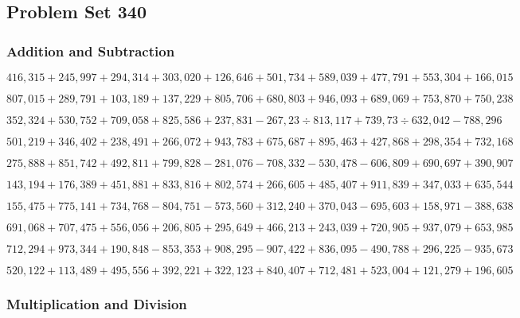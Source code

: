 \hypertarget{problem-set-340}{%
\subsection{Problem Set 340}\label{problem-set-340}}

\hypertarget{addition-and-subtraction}{%
\subsubsection{Addition and
Subtraction}\label{addition-and-subtraction}}

\(416,315+245,997+294,314+303,020+126,646+501,734+589,039+477,791+553,304+166,015\)

\(807,015+289,791+103,189+137,229+805,706+680,803+946,093+689,069+753,870+750,238\)

\(352,324+530,752+709,058+825,586+237,831-267,23÷813,117+739,73÷632,042-788,296\)

\(501,219+346,402+238,491+266,072+943,783+675,687+895,463+427,868+298,354+732,168\)

\(275,888+851,742+492,811+799,828-281,076-708,332-530,478-606,809+690,697+390,907\)

\(143,194+176,389+451,881+833,816+802,574+266,605+485,407+911,839+347,033+635,544\)

\(155,475+775,141+734,768-804,751-573,560+312,240+370,043-695,603+158,971-388,638\)

\(691,068+707,475+556,056+206,805+295,649+466,213+243,039+720,905+937,079+653,985\)

\(712,294+973,344+190,848-853,353+908,295-907,422+836,095-490,788+296,225-935,673\)

\(520,122+113,489+495,556+392,221+322,123+840,407+712,481+523,004+121,279+196,605\)

\hypertarget{multiplication-and-division}{%
\subsubsection{Multiplication and
Division}\label{multiplication-and-division}}

